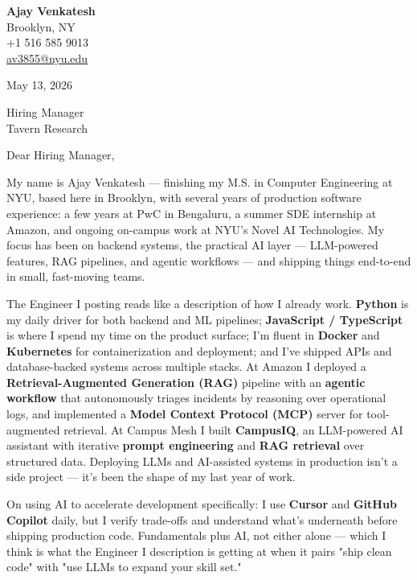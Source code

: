\documentclass[letterpaper,11pt]{article}
\begin{document}
\begin{flushleft}
\textbf{\large Ajay Venkatesh} \\
Brooklyn, NY \\
+1 516 585 9013 \\
\href{mailto:av3855@nyu.edu}{av3855@nyu.edu}
\end{flushleft}

\vspace{10pt}

May 13, 2026

\vspace{6pt}

Hiring Manager \\
Tavern Research

\vspace{10pt}

Dear Hiring Manager,

My name is Ajay Venkatesh --- finishing my M.S. in Computer Engineering at NYU, based here in Brooklyn, with several years of production software experience: a few years at PwC in Bengaluru, a summer SDE internship at Amazon, and ongoing on-campus work at NYU's Novel AI Technologies. My focus has been on backend systems, the practical AI layer --- LLM-powered features, RAG pipelines, and agentic workflows --- and shipping things end-to-end in small, fast-moving teams.

The Engineer I posting reads like a description of how I already work. \textbf{Python} is my daily driver for both backend and ML pipelines; \textbf{JavaScript / TypeScript} is where I spend my time on the product surface; I'm fluent in \textbf{Docker} and \textbf{Kubernetes} for containerization and deployment; and I've shipped APIs and database-backed systems across multiple stacks. At Amazon I deployed a \textbf{Retrieval-Augmented Generation (RAG)} pipeline with an \textbf{agentic workflow} that autonomously triages incidents by reasoning over operational logs, and implemented a \textbf{Model Context Protocol (MCP)} server for tool-augmented retrieval. At Campus Mesh I built \textbf{CampusIQ}, an LLM-powered AI assistant with iterative \textbf{prompt engineering} and \textbf{RAG retrieval} over structured data. Deploying LLMs and AI-assisted systems in production isn't a side project --- it's been the shape of my last year of work.

On using AI to accelerate development specifically: I use \textbf{Cursor} and \textbf{GitHub Copilot} daily, but I verify trade-offs and understand what's underneath before shipping production code. Fundamentals plus AI, not either alone --- which I think is what the Engineer I description is getting at when it pairs "ship clean code" with "use LLMs to expand your skill set."
\end{document}
